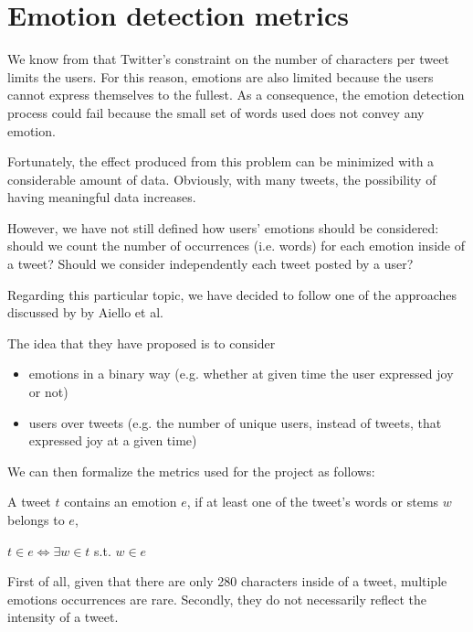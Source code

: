 \section{Emotion detection metrics}
\label{sec:metrics}

We know from  that Twitter's constraint on the number of characters per tweet limits the users. For this reason, emotions are also limited because the users cannot express themselves to the fullest. As a consequence, the emotion detection process could fail because the small set of words used does not convey any emotion. 

Fortunately, the effect produced from this problem can be minimized with a considerable amount of data. Obviously, with many tweets, the possibility of having meaningful data increases.

However, we have not still defined how users' emotions should be considered: should we count the number of occurrences (i.e. words) for each emotion inside of a tweet? Should we consider independently each tweet posted by a user?

Regarding this particular topic, we have decided to follow one of the approaches discussed by  by Aiello et al.~\cite{aiello2020epidemic}

The idea that they have proposed is to consider
	
\begin{itemize}
	\item emotions in a binary way (e.g. whether at given time the user expressed joy or not)
	\item users over tweets (e.g. the number of unique users, instead of tweets, that expressed joy at a given time)
\end{itemize}

We can then formalize the metrics used for the project as follows:

\begin{definition}
\label{def:tweet-emotions}
	A tweet \(t\) contains an emotion \(e\), if at least one of the tweet's words or stems \(w\) belongs to \(e\),
	\begin{center}
		\(t \in e \Leftrightarrow \exists w \in t\)  s.t. \(w \in e\)
	\end{center}
\end{definition}

First of all, given that there are only 280 characters inside of a tweet, multiple emotions occurrences are rare. Secondly, they do not necessarily reflect the intensity of a tweet. 
	
